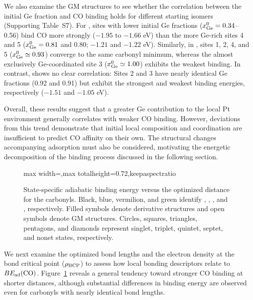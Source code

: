 We also examine the GM structures to see whether the correlation between the initial Ge fraction and CO binding holds for different starting isomers (Supporting Table~S7). For , sites with lower initial Ge fractions ($x_{\rm Ge}^{0}=0.34$--0.56) bind CO more strongly ($-1.95$ to $-1.66$ eV) than the more Ge-rich sites 4 and 5 ($x_{\rm Ge}^{0}=0.81$ and 0.80; $-1.21$ and $-1.22$ eV). Similarly, in , sites 1, 2, 4, and 5 ($x_{\rm Ge}^{0}\simeq0.93$) converge to the same carbonyl minimum, whereas the almost exclusively Ge-coordinated site 3 ($x_{\rm Ge}^{0}\simeq1.00$) exhibits the weakest binding. In contrast,  shows no clear correlation: Sites 2 and 3 have nearly identical Ge fractions (0.92 and 0.91) but exhibit the strongest and weakest binding energies, respectively ($-1.51$ and $-1.05$ eV).

Overall, these results suggest that a greater Ge contribution to the local Pt environment generally correlates with weaker CO binding. However, deviations from this trend demonstrate that initial local composition and coordination are insufficient to predict CO affinity on their own. The structural changes accompanying adsorption must also be considered, motivating the energetic decomposition of the binding process discussed in the following section.

\begin{figure}[htbp]
	\begin{center}
\begin{adjustbox}{max width=\linewidth,max totalheight=0.72\textheight,keepaspectratio}

\end{adjustbox}
	\end{center}
\caption{State-specific adiabatic  binding energy versus the optimized
 distance for the carbonyls. Black, blue, vermilion, and green identify , , , and , respectively. Filled symbols denote derivative structures and open symbols denote GM structures. Circles, squares, triangles, pentagons, and diamonds represent singlet, triplet, quintet, septet, and nonet states, respectively.}
\label{fig:neutral_be_vs_ptc}
\end{figure}

We next examine the optimized  bond lengths and the electron density at
the bond critical point ($\rho_{\rm BCP}$) to assess how local bonding
descriptors relate to  \(BE_{\rm ad}(\ce{CO})\). Figure~\ref{fig:neutral_be_vs_ptc} reveals a general tendency toward stronger CO binding at shorter  distances, although substantial differences in binding energy are observed even for carbonyls with nearly identical bond lengths.

